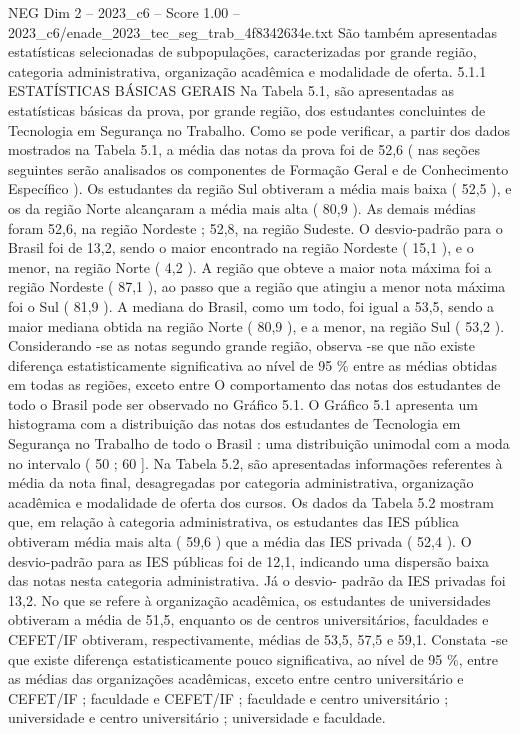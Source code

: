 \begin{textsample}{NEG Dim 2 – 2023\_c6 – Score 1.00 – 2023\_c6/enade\_2023\_tec\_seg\_trab\_4f8342634e.txt}
São também apresentadas estatísticas selecionadas de subpopulações, caracterizadas por grande região, categoria administrativa, organização acadêmica e modalidade de oferta. 5.1.1 ESTATÍSTICAS BÁSICAS GERAIS Na Tabela 5.1, são apresentadas as estatísticas básicas da prova, por grande região, dos estudantes concluintes de Tecnologia em Segurança no Trabalho.
Como se pode verificar, a partir dos dados mostrados na Tabela 5.1, a média das notas da prova foi de 52,6 ( nas seções seguintes serão analisados os componentes de Formação Geral e de Conhecimento Específico ).
Os estudantes da região Sul obtiveram a média mais baixa ( 52,5 ), e os da região Norte alcançaram a média mais alta ( 80,9 ).
As demais médias foram 52,6, na região Nordeste ; 52,8, na região Sudeste.
O desvio-padrão para o Brasil foi de 13,2, sendo o maior encontrado na região Nordeste ( 15,1 ), e o menor, na região Norte ( 4,2 ).
A região que obteve a maior nota máxima foi a região Nordeste ( 87,1 ), ao passo que a região que atingiu a menor nota máxima foi o Sul ( 81,9 ).
A mediana do Brasil, como um todo, foi igual a 53,5, sendo a maior mediana obtida na região Norte ( 80,9 ), e a menor, na região Sul ( 53,2 ).
Considerando -se as notas segundo grande região, observa -se que não existe diferença estatisticamente significativa ao nível de 95 \% entre as médias obtidas em todas as regiões, exceto entre O comportamento das notas dos estudantes de todo o Brasil pode ser observado no Gráfico 5.1.
O Gráfico 5.1 apresenta um histograma com a distribuição das notas dos estudantes de Tecnologia em Segurança no Trabalho de todo o Brasil : uma distribuição unimodal com a moda no intervalo ( 50 ; 60 ].
Na Tabela 5.2, são apresentadas informações referentes à média da nota final, desagregadas por categoria administrativa, organização acadêmica e modalidade de oferta dos cursos.
Os dados da Tabela 5.2 mostram que, em relação à categoria administrativa, os estudantes das IES pública obtiveram média mais alta ( 59,6 ) que a média das IES privada ( 52,4 ).
O desvio-padrão para as IES públicas foi de 12,1, indicando uma dispersão baixa das notas nesta categoria administrativa.
Já o desvio- padrão da IES privadas foi 13,2.
No que se refere à organização acadêmica, os estudantes de universidades obtiveram a média de 51,5, enquanto os de centros universitários, faculdades e CEFET/IF obtiveram, respectivamente, médias de 53,5, 57,5 e 59,1.
Constata -se que existe diferença estatisticamente pouco significativa, ao nível de 95 \%, entre as médias das organizações acadêmicas, exceto entre centro universitário e CEFET/IF ; faculdade e CEFET/IF ; faculdade e centro universitário ; universidade e centro universitário ; universidade e faculdade.

\end{textsample}
